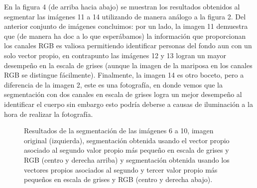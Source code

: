 \documentclass[conference]{IEEEtran}
\begin{document}
\FloatBarrier
\newpage
En la figura 4 (de arriba hacia abajo) se muestran los resultados obtenidos al segmentar las imágenes 11 a 14 utilizando de manera análogo a la figura 2. Del anterior conjunto de imágenes concluimos: por un lado, la imagen 11 demuestra que (de manera ha doc a lo que esperábamos) la información que proporcionan los canales RGB es valiosa permitiendo identificar personas del fondo aun con un solo vector propio, en contrapunto las imágenes 12 y 13 logran un mayor desempeño en la escala de grises (aunque la imagen de la mariposa en los canales RGB se distingue fácilmente). Finalmente, la imagen 14 es otro boceto, pero a diferencia de la imagen 2, este es una fotografía, en donde vemos que la segmentación con dos canales en escala de grises logra un mejor desempeño al identificar el cuerpo sin embargo esto podría deberse a causas de iluminación a la hora de realizar la fotografía.


\begin{figure}[htbp]
\caption{Resultados de la segmentación de las imágenes 6 a 10, imagen original (izquierda), segmentación obtenida usando el vector propio asociado al segundo valor propio más pequeño en escala de grises y RGB (centro y derecha arriba) y segmentación obtenida usando los vectores propios asociados al segundo y tercer valor propio más pequeños en escala de grises y RGB (centro y derecha abajo).}
\label{res2}
\end{figure}
\FloatBarrier
\newpage
\end{document}

